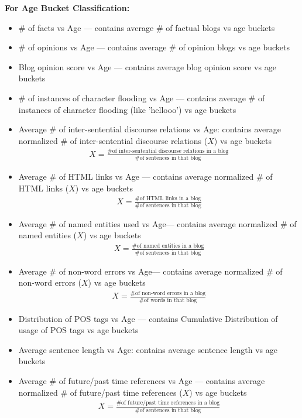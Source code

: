\documentclass{sig-alternate}
\begin{document}
\begin{figure*}
%
\hspace*{\fill}
%
\end{figure*}
\pagebreak
\textbf{For Age Bucket Classification:}
\begin{itemize}
\item \# of facts vs Age --- contains average \# of factual blogs vs age buckets 
\item \# of opinions vs Age --- contains average \# of opinion blogs vs age buckets 
\item Blog opinion score vs Age --- contains average blog opinion score vs age buckets
\item \# of instances of character flooding vs Age --- contains average \# of instances of character flooding (like 'hellooo') vs age buckets
\item Average \# of inter-sentential discourse relations vs Age: contains average normalized \# of inter-sentential discourse relations ($X$) vs age buckets
\begin{align}
X = \frac{\# \textrm{of inter-sentential discourse relations in a blog}}{\#\textrm{of sentences in that blog}}
\end{align}
\item Average \# of HTML links vs Age --- contains average normalized \# of HTML links ($X$) vs age buckets
\begin{align}
X = \frac{\# \textrm{of HTML links in a blog}}{\#\textrm{of sentences in that blog}}
\end{align}
\item Average \# of named entities used vs Age--- contains average normalized \# of named entities ($X$) vs age buckets
\begin{align}
X = \frac{\# \textrm{of named entities in a blog}}{\#\textrm{of sentences in that blog}}
\end{align}
\item Average \# of non-word errors vs Age--- contains average normalized \# of non-word errors ($X$) vs age buckets
\begin{align}
X = \frac{\# \textrm{of non-word errors in a blog}}{\#\textrm{of words in that blog}}
\end{align}
\item Distribution of POS tags vs Age --- contains Cumulative Distribution of usage of POS tags vs age buckets
\item Average sentence length vs Age: contains average sentence length vs age buckets 
\item Average \# of future/past time references vs Age --- contains average normalized \# of future/past time references ($X$) vs age buckets
\begin{align}
X = \frac{\# \textrm{of future/past time references in a blog}}{\#\textrm{of sentences in that blog}}
\end{align}
\end{itemize}
\end{document}
